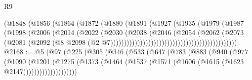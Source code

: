 \begin{lexlean}{R9}
\begin{coremodule}
                                                  (@1848
                                                    (@1856
                                                      (@1864
                                                        (@1872
                                                          (@1880
                                                            (@1891
                                                              (@1927
                                                                (@1935
                                                                  (@1979
                                                                    (@1987
                                                                      (@1998
                                                                        (@2006
                                                                          (@2014
                                                                            (@2022
                                                                              (@2030
                                                                                (@2038
                                                                                  (@2046
                                                                                    (@2054
                                                                                      (@2062
                                                                                        (@2073
                                                                                          (@2081
                                                                                            (@2092
                                                                                              (@8
                                                                                                @2098
                                                                                                (@2
                                                                                                  @7)))))))))))))))))))))))))))))))))))))))))))))))
@2168 := @5
    (@97
      (@225
        (@305
          (@346
            (@533
              (@647
                (@783
                  (@883
                    (@940
                      (@977
                        (@1090
                          (@1201
                            (@1275
                              (@1373
                                (@1464 (@1537 (@1571 (@1606 (@1615 (@1623 @2147))))))))))))))))))))

\end{coremodule}
\end{lexlean}
